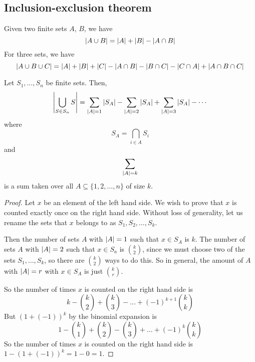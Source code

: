 \subsection{Inclusion-exclusion theorem}
Given two finite sets \(A\), \(B\), we have
\[
	\abs{A \cup B} = \abs{A} + \abs{B} - \abs{A \cap B}
\]
For three sets, we have
\[
	\abs{A \cup B \cup C} = \abs{A} + \abs{B} + \abs{C} - \abs{A \cap B} - \abs{B \cap C} - \abs{C \cap A} + \abs{A \cap B \cap C}
\]
\begin{theorem}
	Let \(S_1, \dots, S_n\) be finite sets.
	Then,
	\[
		\abs{\bigcup_{S \in S_n} S} = \sum_{\abs{A} = 1}\abs{S_A} - \sum_{\abs{A} = 2}\abs{S_A} + \sum_{\abs{A} = 3}\abs{S_A} - \cdots
	\]
	where
	\[
		S_A = \bigcap_{i \in A}S_i
	\]
	and
	\[
		\sum_{\abs{A} = k}
	\]
	is a sum taken over all \(A \subseteq \{ 1, 2, \dots, n \}\) of size \(k\).
\end{theorem}
\begin{proof}
	Let \(x\) be an element of the left hand side.
	We wish to prove that \(x\) is counted exactly once on the right hand side.
	Without loss of generality, let us rename the sets that \(x\) belongs to as \(S_1, S_2, \dots, S_k\).

	Then the number of sets \(A\) with \(\abs{A} = 1\) such that \(x \in S_A\) is \(k\).
	The number of sets \(A\) with \(\abs{A} = 2\) such that \(x \in S_a\) is \(\binom{k}{2}\), since we must choose two of the sets \(S_1, \dots, S_k\), so there are \(\binom{k}{2}\) ways to do this.
	So in general, the amount of \(A\) with \(\abs{A} = r\) with \(x \in S_A\) is just \(\binom{k}{r}\).

	So the number of times \(x\) is counted on the right hand side is
	\[
		k - \binom{k}{2} + \binom{k}{3} - \dots + (-1)^{k+1}\binom{k}{k}
	\]
	But \((1 + (-1))^k\) by the binomial expansion is
	\[
		1 - \binom{k}{1} + \binom{k}{2} - \binom{k}{3} + \dots + (-1)^k\binom{k}{k}
	\]
	So the number of times \(x\) is counted on the right hand side is \(1 - (1 + (-1))^k = 1 - 0 = 1\).
\end{proof}
